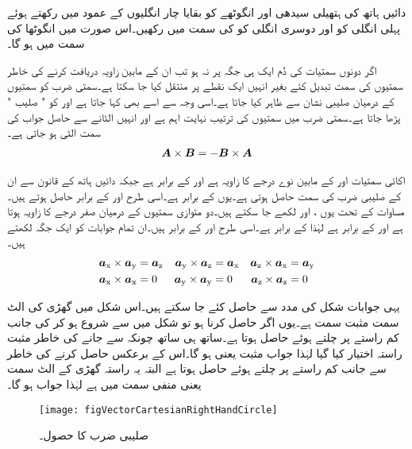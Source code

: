 دائیں ہاتھ کی ہتھیلی  سیدھی اور انگوٹھے کو بقایا چار انگلیوں کے عمود میں رکھتے ہوئے پہلی انگلی کو  اور  دوسری انگلی کو  کی سمت میں رکھیں۔اس صورت میں انگوٹھا  کی سمت میں ہو گا۔

اگر دونوں سمتیات کی دُم ایک ہی جگہ پر نہ ہو تب ان کے مابین زاویہ دریافت کرنے کی  خاطر سمتیوں کی سمت تبدیل کئے بغیر انہیں ایک نقطے پر منتقل کیا جا سکتا ہے۔سمتی ضرب کو سمتیوں کے درمیان صلیبی نشان  سے ظاہر کیا جاتا ہے۔اسی وجہ سے اسے  بھی کہا جاتا ہے اور  کو " صلیب " پڑھا جاتا ہے۔سمتی ضرب میں سمتیوں کی ترتیب نہایت اہم ہے اور انہیں الٹانے سے حاصل جواب کی سمت الٹی ہو جاتی ہے۔
\begin{align}\label{مساوات_سمتیہ_صلیبی_ضرب_ترتیب_الٹاتے_منفی_سمت}
{\ensuremath{{\boldsymbol{A}}}} \times {\ensuremath{{\boldsymbol{B}}}}=- {{\boldsymbol{B}}} \times {\ensuremath{{\boldsymbol{A}}}}
\end{align}

اکائی سمتیات  اور  کے مابین نوے درجے کا زاویہ ہے  اور  کے برابر ہے جبکہ دائیں ہاتھ کے قانون سے ان کے صلیبی ضرب کی سمت  حاصل ہوتی ہے۔یوں  کے برابر ہے۔اسی طرح  اور  کے برابر حاصل ہوتے ہیں۔مساوات  کے تحت یوں ،  اور  لکھے جا سکتے ہیں۔دو متوازی سمتیوں کے درمیان صفر درجے کا زاویہ ہوتا ہے اور  کے برابر ہے لہٰذا  کے برابر ہے۔اسی طرح  اور  کے برابر ہیں۔ان تمام جوابات کو ایک جگہ لکھتے ہیں۔
\begin{gather}
\begin{aligned}\label{مساوات_سمتیہ_کارتیسی_اکائی_سمتیات_صلیبی_ضرب}
{\boldsymbol{a}}_{\textup{x}} \times {\boldsymbol{a}}_{\textup{y}} &={\boldsymbol{a}}_{\textup{z}} & {\boldsymbol{a}}_{\textup{y}} \times {\boldsymbol{a}}_{\textup{z}}&={\boldsymbol{a}}_{\textup{x}} & {\boldsymbol{a}}_{\textup{z}} \times {\boldsymbol{a}}_{\textup{x}}&={\boldsymbol{a}}_{\textup{y}}\\
{\boldsymbol{a}}_{\textup{x}} \times {\boldsymbol{a}}_{\textup{x}}&=0 & {\boldsymbol{a}}_{\textup{y}} \times {\boldsymbol{a}}_{\textup{y}}&=0 & {\boldsymbol{a}}_{\textup{z}} \times {\boldsymbol{a}}_{\textup{z}}&=0
\end{aligned}
\end{gather}

یہی جوابات شکل  کی مدد سے حاصل کئے جا سکتے ہیں۔اس شکل میں گھڑی کی الٹ سمت مثبت سمت ہے۔یوں اگر  حاصل کرنا ہو تو شکل میں  سے شروع ہو کر  کی جانب کم راستے پر چلتے ہوئے   حاصل ہوتا ہے۔ساتھ ہی ساتھ چونکہ  سے  جانے کی خاطر  مثبت راستہ اختیار کیا گیا لہٰذا جواب مثبت یعنی  ہو گا۔اس کے برعکس  حاصل کرنے کی خاطر  سے  جانب کم راستے پر چلتے ہوئے  حاصل ہوتا ہے البتہ یہ راستہ گھڑی کے الٹ سمت یعنی منفی سمت میں ہے لہٰذا جواب  ہو گا۔
\begin{figure}
\centering
\texttt{[image: figVectorCartesianRightHandCircle]}
\caption{صلیبی ضرب کا حصول۔}
\label{شکل_سمتیہ_صلیبی_ضرب_مثبت_دائرہ}
\end{figure}

